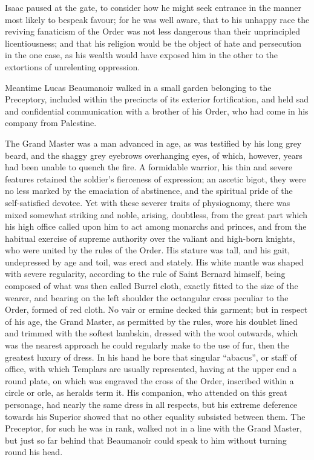 Isaac paused at the gate, to consider how he might seek entrance in the
manner most likely to bespeak favour; for he was well aware, that to his
unhappy race the reviving fanaticism of the Order was not less dangerous
than their unprincipled licentiousness; and that his religion would be
the object of hate and persecution in the one case, as his wealth would
have exposed him in the other to the extortions of unrelenting
oppression.

Meantime Lucas Beaumanoir walked in a small garden belonging to the
Preceptory, included within the precincts of its exterior fortification,
and held sad and confidential communication with a brother of his Order,
who had come in his company from Palestine.

The Grand Master was a man advanced in age, as was testified by his long
grey beard, and the shaggy grey eyebrows overhanging eyes, of which,
however, years had been unable to quench the fire. A formidable warrior,
his thin and severe features retained the soldier's fierceness of
expression; an ascetic bigot, they were no less marked by the emaciation
of abstinence, and the spiritual pride of the self-satisfied devotee.
Yet with these severer traits of physiognomy, there was mixed somewhat
striking and noble, arising, doubtless, from the great part which his
high office called upon him to act among monarchs and princes, and from
the habitual exercise of supreme authority over the valiant and
high-born knights, who were united by the rules of the Order. His
stature was tall, and his gait, undepressed by age and toil, was erect
and stately. His white mantle was shaped with severe regularity,
according to the rule of Saint Bernard himself, being composed of what
was then called Burrel cloth, exactly fitted to the size of the wearer,
and bearing on the left shoulder the octangular cross peculiar to the
Order, formed of red cloth. No vair or ermine decked this garment; but
in respect of his age, the Grand Master, as permitted by the rules, wore
his doublet lined and trimmed with the softest lambskin, dressed with
the wool outwards, which was the nearest approach he could regularly
make to the use of fur, then the greatest luxury of dress. In his hand
he bore that singular ``abacus'', or staff of office, with which
Templars are usually represented, having at the upper end a round plate,
on which was engraved the cross of the Order, inscribed within a circle
or orle, as heralds term it. His companion, who attended on this great
personage, had nearly the same dress in all respects, but his extreme
deference towards his Superior showed that no other equality subsisted
between them. The Preceptor, for such he was in rank, walked not in a
line with the Grand Master, but just so far behind that Beaumanoir could
speak to him without turning round his head.

